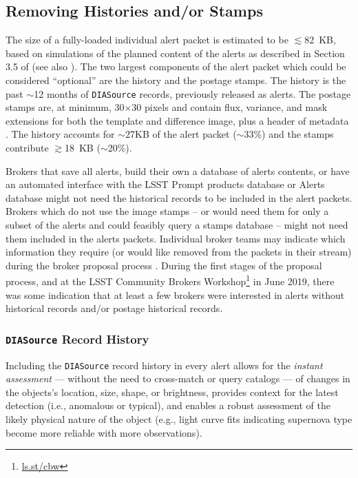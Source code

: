 \documentclass[DM,lsstdraft,authoryear,toc]{lsstdoc}
\begin{document}
\subsection{Removing Histories and/or Stamps}\label{ssec:packets_remove}

The size of a fully-loaded individual alert packet is estimated to be $\lesssim$82~KB, based on simulations of the planned content of the alerts as described in Section 3.5 of  (see also ).
The two largest components of the alert packet which could be considered ``optional'' are the history and the postage stamps.
The history is the past $\sim$12 months of {\tt DIASource} records, previously released as alerts.
The postage stamps are, at minimum, 30$\times$30 pixels and contain flux, variance, and mask extensions for both the template and difference image, plus a header of metadata .
The history accounts for $\sim$27KB of the alert packet ($\sim$33\%) and the stamps contribute $\gtrsim$18~KB ($\sim$20\%). 

Brokers that save all alerts, build their own a database of alerts contents, or have an automated interface with the LSST Prompt products database or Alerts database might not need the historical records to be included in the alert packets.
Brokers which do not use the image stamps -- or would need them for only a subset of the alerts and could feasibly query a stamps database -- might not need them included in the alerts packets.
Individual broker teams may indicate which information they require (or would like removed from the packets in their stream) during the broker proposal process .
During the first stages of the proposal process, and at the LSST Community Brokers Workshop\footnote{\url{ls.st/cbw}} in June 2019, there was some indication that at least a few brokers were interested in alerts without historical records and/or postage historical records.

\subsubsection{{\tt DIASource} Record History}\label{sssec:packets_remove_hist}

Including the {\tt DIASource} record history in every alert allows for the \emph{instant assessment} --- without the need to cross-match or query catalogs --- of changes in the objects's location, size, shape, or brightness, provides context for the latest detection (i.e., anomalous or typical), and enables a robust assessment of the likely physical nature of the object (e.g., light curve fits indicating supernova type become more reliable with more observations). 
\end{document}
